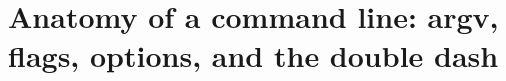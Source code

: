 \chapter{Anatomy of a command line: argv, flags, options, and the double dash}
\label{ch:anatomy-of-a-command-line-argv-flags}

